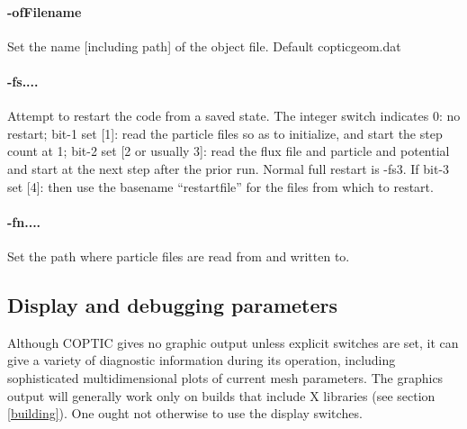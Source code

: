 \documentclass[12pt]{article}
\begin{document}
\paragraph{-ofFilename} Set the name [including path] of the object
file. Default copticgeom.dat

\paragraph{-fs....}  Attempt to restart the code from a saved
state. The integer switch indicates 0: no restart; bit-1 set [1]: read
the particle files so as to initialize, and start the step count at 1;
bit-2 set [2 or usually 3]: read the flux file and particle and
potential and start at the next step after the prior run. Normal full
restart is -fs3. If bit-3 set [4]: then use the basename
``restartfile'' for the files from which to restart.

\paragraph{-fn....} Set the path where particle files are read from
and written to.

\subsection{Display and debugging parameters}

Although COPTIC gives no graphic output unless explicit switches are
set, it can give a variety of diagnostic information during its
operation, including sophisticated multidimensional plots of current
mesh parameters.  The graphics output will generally work only on
builds that include X libraries (see section \ref{building}). One
ought not otherwise to use the display switches.
\end{document}
